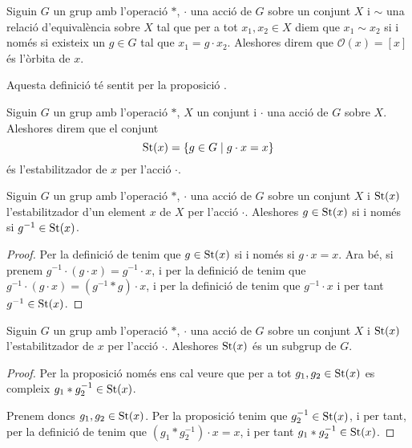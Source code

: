 \documentclass[../Apunts.tex]{subfiles}
\begin{document}
	\begin{definition}
		\label{def:òrbita d'un element d'un G-conjunt}
		Siguin \(G\) un grup amb l'operació \(\ast\), \(\cdot\) una acció de \(G\) sobre un conjunt \(X\) i \(\sim\) una relació d'equivalència sobre \(X\) tal que per a tot \(x_{1},x_{2}\in X\) diem que \(x_{1}\sim x_{2}\) si i només si existeix un \(g\in G\) tal que \(x_{1}=g\cdot x_{2}\). Aleshores direm que \(\mathcal{O}(x)=[x]\) és l'òrbita de \(x\).
		
		Aquesta definició té sentit per la proposició .
	\end{definition}
	\begin{definition}
		\label{def:l'estabilitzador d'un element per una acció}
		Siguin \(G\) un grup amb l'operació \(\ast\), \(X\) un conjunt i \(\cdot\) una acció de \(G\) sobre \(X\). Aleshores direm que el conjunt
		\[\operatorname{St}(x)=\{g\in G\mid g\cdot x=x\}\]
		és l'estabilitzador de \(x\) per l'acció \(\cdot\).
	\end{definition}
	\begin{proposition}
		\label{prop:l'invers d'un element pertany a l'estabilitzador per una acció}
		Siguin \(G\) un grup amb l'operació \(\ast\), \(\cdot\) una acció de \(G\) sobre un conjunt \(X\) i \(\operatorname{St}(x)\) l'estabilitzador d'un element \(x\) de \(X\) per l'acció \(\cdot\). Aleshores \(g\in\operatorname{St}(x)\) si i només si \(g^{-1}\in\operatorname{St}(x)\).
		\begin{proof}
			Per la definició de  tenim que \(g\in\operatorname{St}(x)\) si i només si \(g\cdot x=x\). Ara bé, si prenem \(g^{-1}\cdot (g\cdot x)=g^{-1}\cdot x\), i per la definició de  tenim que \(g^{-1}\cdot(g\cdot x)=(g^{-1}\ast g)\cdot x\), i per la definició de  tenim que \(g^{-1}\cdot x\) i per tant \(g^{-1}\in\operatorname{St}(x)\).
		\end{proof}
	\end{proposition}
	\begin{proposition}
		\label{prop:l'estabilitzador és un subgrup}
		Siguin \(G\) un grup amb l'operació \(\ast\), \(\cdot\) una acció de \(G\) sobre un conjunt \(X\) i \(\operatorname{St}(x)\) l'estabilitzador de \(x\) per l'acció \(\cdot\). Aleshores \(\operatorname{St}(x)\) és un subgrup de \(G\).
		\begin{proof}
			Per la proposició  només ens cal veure que per a tot \(g_{1},g_{2}\in\operatorname{St}(x)\) es compleix \(g_{1}\ast g_{2}^{-1}\in\operatorname{St}(x)\).
			
			Prenem doncs \(g_{1},g_{2}\in\operatorname{St}(x)\). Per la proposició  tenim que \(g_{2}^{-1}\in\operatorname{St}(x)\), i per tant, per la definició de  tenim que \((g_{1}\ast g_{2}^{-1})\cdot x=x\), i per tant \(g_{1}\ast g_{2}^{-1}\in\operatorname{St}(x)\).
		\end{proof}
	\end{proposition}
\end{document}
